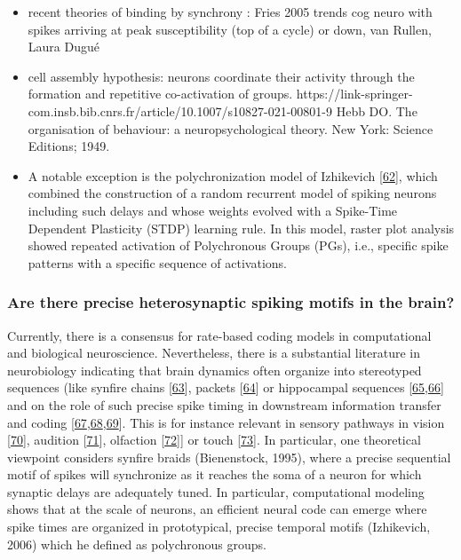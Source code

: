 \begin{itemize}
\item
  recent theories of binding by synchrony : Fries 2005 trends cog neuro with spikes arriving at peak susceptibility (top of a cycle) or down, van Rullen, Laura Dugué
\item
  cell assembly hypothesis: neurons coordinate their activity through the formation and repetitive co-activation of groups. https://link-springer-com.insb.bib.cnrs.fr/article/10.1007/s10827-021-00801-9 Hebb DO. The organisation of behaviour: a neuropsychological theory. New York: Science Editions; 1949.
\item
  A notable exception is the polychronization model of Izhikevich {[}\protect\hyperlink{ref-SM9G0xBK}{62}{]}, which combined the construction of a random recurrent model of spiking neurons including such delays and whose weights evolved with a Spike-Time Dependent Plasticity (STDP) learning rule. In this model, raster plot analysis showed repeated activation of Polychronous Groups (PGs), i.e., specific spike patterns with a specific sequence of activations.
\end{itemize}

\hypertarget{are-there-precise-heterosynaptic-spiking-motifs-in-the-brain}{%
\subsubsection{Are there precise heterosynaptic spiking motifs in the brain?}\label{are-there-precise-heterosynaptic-spiking-motifs-in-the-brain}}

Currently, there is a consensus for rate-based coding models in computational and biological neuroscience. Nevertheless, there is a substantial literature in neurobiology indicating that brain dynamics often organize into stereotyped sequences (like synfire chains {[}\protect\hyperlink{ref-Mf6h1KNY}{63}{]}, packets {[}\protect\hyperlink{ref-2GovoaYw}{64}{]} or hippocampal sequences {[}\protect\hyperlink{ref-SVfasyCp}{65},\protect\hyperlink{ref-PUNGVou}{66}{]} and on the role of such precise spike timing in downstream information transfer and coding {[}\protect\hyperlink{ref-19fAM6hcv}{67},\protect\hyperlink{ref-13dQ0R4UM}{68},\protect\hyperlink{ref-MfmcMsqA}{69}{]}. This is for instance relevant in sensory pathways in vision {[}\protect\hyperlink{ref-1EHZgcKyL}{70}{]}, audition {[}\protect\hyperlink{ref-FlKJw2VL}{71}{]}, olfaction {[}\protect\hyperlink{ref-AhSRXBJ2}{72}{]}{]} or touch {[}\protect\hyperlink{ref-gDinei4a}{73}{]}. In particular, one theoretical viewpoint considers synfire braids (Bienenstock, 1995), where a precise sequential motif of spikes will synchronize as it reaches the soma of a neuron for which synaptic delays are adequately tuned. In particular, computational modeling shows that at the scale of neurons, an efficient neural code can emerge where spike times are organized in prototypical, precise temporal motifs (Izhikevich, 2006) which he defined as polychronous groups.

